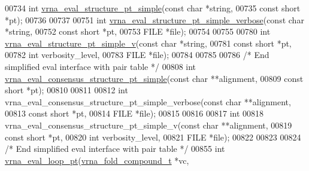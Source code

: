 \begin{DoxyCode}
00734 \textcolor{keywordtype}{int} \hyperlink{group__eval_ga0bba59b4d6e53461088666ff4aece7b0}{vrna\_eval\_structure\_pt\_simple}(\textcolor{keyword}{const} \textcolor{keywordtype}{char}  *\textcolor{keywordtype}{string},
00735                                   \textcolor{keyword}{const} \textcolor{keywordtype}{short} *pt);
00736 
00737 
00751 \textcolor{keywordtype}{int} \hyperlink{group__eval_ga76e152ee9a02be23da14cdddf52b4e44}{vrna\_eval\_structure\_pt\_simple\_verbose}(\textcolor{keyword}{const} \textcolor{keywordtype}{char}  *\textcolor{keywordtype}{string},
00752                                           \textcolor{keyword}{const} \textcolor{keywordtype}{short} *pt,
00753                                           FILE        *file);
00754 
00755 
00780 \textcolor{keywordtype}{int} \hyperlink{group__eval_gac40b813d35289da9816d0c1eec94faa5}{vrna\_eval\_structure\_pt\_simple\_v}(\textcolor{keyword}{const} \textcolor{keywordtype}{char}  *\textcolor{keywordtype}{string},
00781                                     \textcolor{keyword}{const} \textcolor{keywordtype}{short} *pt,
00782                                     \textcolor{keywordtype}{int}         verbosity\_level,
00783                                     FILE        *file);
00784 
00785 
00786 \textcolor{comment}{/* End simplified eval interface with pair table */}
00808 \textcolor{keywordtype}{int} \hyperlink{group__eval_gabbb4d2a7aa324ec9cce8f47ce61ab8af}{vrna\_eval\_consensus\_structure\_pt\_simple}(\textcolor{keyword}{const} \textcolor{keywordtype}{char}  **alignment,
00809                                             \textcolor{keyword}{const} \textcolor{keywordtype}{short} *pt);
00810 
00811 
00812 \textcolor{keywordtype}{int} vrna\_eval\_consensus\_structure\_pt\_simple\_verbose(\textcolor{keyword}{const} \textcolor{keywordtype}{char}  **alignment,
00813                                                     \textcolor{keyword}{const} \textcolor{keywordtype}{short} *pt,
00814                                                     FILE        *file);
00815 
00816 
00817 \textcolor{keywordtype}{int}
00818 vrna\_eval\_consensus\_structure\_pt\_simple\_v(\textcolor{keyword}{const} \textcolor{keywordtype}{char}  **alignment,
00819                                           \textcolor{keyword}{const} \textcolor{keywordtype}{short} *pt,
00820                                           \textcolor{keywordtype}{int}         verbosity\_level,
00821                                           FILE        *file);
00822 
00823 
00824 \textcolor{comment}{/* End simplified eval interface with pair table */}
00855 \textcolor{keywordtype}{int} \hyperlink{group__eval__loops_ga730ba4df55c02fd530a0cddd49faf760}{vrna\_eval\_loop\_pt}(\hyperlink{group__fold__compound_structvrna__fc__s}{vrna\_fold\_compound\_t}  *vc,

\end{DoxyCode}
